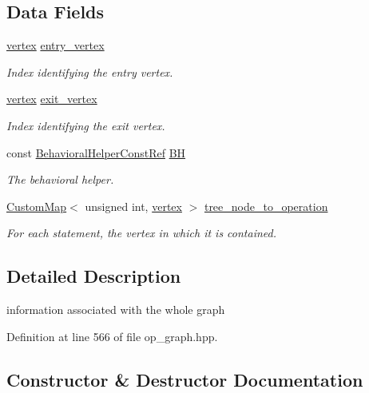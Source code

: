 \subsection*{Data Fields}
\begin{DoxyCompactItemize}
\item 
\hyperlink{graph_8hpp_abefdcf0544e601805af44eca032cca14}{vertex} \hyperlink{structOpGraphInfo_ab986e971bdcdfa929d9eb4f454b3b8ce}{entry\+\_\+vertex}
\begin{DoxyCompactList}\small\item\em Index identifying the entry vertex. \end{DoxyCompactList}\item 
\hyperlink{graph_8hpp_abefdcf0544e601805af44eca032cca14}{vertex} \hyperlink{structOpGraphInfo_a8d7ba1cb3875b2d3ba8554ff3664163b}{exit\+\_\+vertex}
\begin{DoxyCompactList}\small\item\em Index identifying the exit vertex. \end{DoxyCompactList}\item 
const \hyperlink{behavioral__helper_8hpp_aae973b54cac87eef3b27442aa3e1e425}{Behavioral\+Helper\+Const\+Ref} \hyperlink{structOpGraphInfo_a9d3f5775dc8dfa04fb9b47d9f5496d15}{BH}
\begin{DoxyCompactList}\small\item\em The behavioral helper. \end{DoxyCompactList}\item 
\hyperlink{custom__map_8hpp_a18ca01763abbe3e5623223bfe5aaac6b}{Custom\+Map}$<$ unsigned int, \hyperlink{graph_8hpp_abefdcf0544e601805af44eca032cca14}{vertex} $>$ \hyperlink{structOpGraphInfo_a5690c4f8ca5dc0dc6a1fe4faa5d5ef3d}{tree\+\_\+node\+\_\+to\+\_\+operation}
\begin{DoxyCompactList}\small\item\em For each statement, the vertex in which it is contained. \end{DoxyCompactList}\end{DoxyCompactItemize}


\subsection{Detailed Description}
information associated with the whole graph 

Definition at line 566 of file op\+\_\+graph.\+hpp.



\subsection{Constructor \& Destructor Documentation}
\mbox{\label{structOpGraphInfo_a6743bf71aca939bf4046e637b4f71b07}} 
